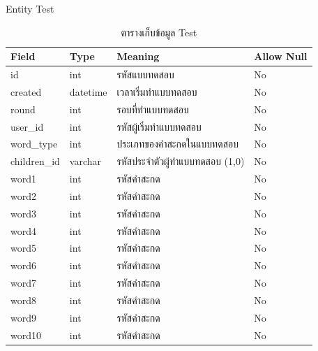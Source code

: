 \documentclass[12pt,oneside,openright,a4paper]{cpe-thai-project}
\begin{document}
    Entity Test
    \begin{table}[!h]\centering
      \caption{ตารางเก็บข้อมูล Test}\label{tbl:application1}
      \begin{tabular}{|p{2cm}|p{2cm}|p{7cm}|p{2cm}|} \hline
        Field & Type & Meaning & Allow Null \\ \hline
        id & int & รหัสแบบทดสอบ & No \\ \hline
        created & datetime & เวลาเริ่มทำแบบทดสอบ &No \\ \hline
        round & int & รอบที่ทำแบบทดสอบ & No\\ \hline
        user\_id & int & รหัสผู้เริ่มทำแบบทดสอบ & No \\ \hline
        word\_type & int & ประเภทของคำสะกดในแบบทดสอบ & No \\ \hline
        children\_id & varchar & รหัสประจำตัวผู้ทำแบบทดสอบ (1,0) & No \\ \hline
        word1 & int & รหัสคำสะกด & No \\ \hline
        word2 & int & รหัสคำสะกด & No \\ \hline
        word3 & int & รหัสคำสะกด & No \\ \hline
        word4 & int & รหัสคำสะกด & No \\ \hline
        word5 & int & รหัสคำสะกด & No \\ \hline
        word6 & int & รหัสคำสะกด & No \\ \hline
        word7 & int & รหัสคำสะกด & No \\ \hline
        word8 & int & รหัสคำสะกด & No \\ \hline
        word9 & int & รหัสคำสะกด & No \\ \hline
        word10 & int & รหัสคำสะกด & No \\ \hline
      \end{tabular}
      \end{table}
\end{document}
